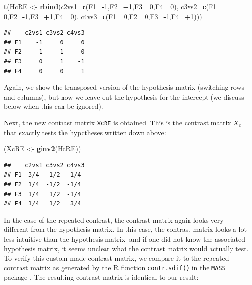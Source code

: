 \documentclass[12pt,]{krantz}
\newenvironment{Shaded}{\begin{snugshade}}{\end{snugshade}}
\newcommand{\KeywordTok}[1]{\textcolor[rgb]{0.13,0.29,0.53}{\textbf{#1}}}
\newcommand{\DataTypeTok}[1]{\textcolor[rgb]{0.13,0.29,0.53}{#1}}
\newcommand{\DecValTok}[1]{\textcolor[rgb]{0.00,0.00,0.81}{#1}}
\newcommand{\StringTok}[1]{\textcolor[rgb]{0.31,0.60,0.02}{#1}}
\newcommand{\OperatorTok}[1]{\textcolor[rgb]{0.81,0.36,0.00}{\textbf{#1}}}
\newcommand{\NormalTok}[1]{#1}
\theoremstyle{definition}
\theoremstyle{definition}
\theoremstyle{definition}
\theoremstyle{remark}
\begin{document}
\begin{Shaded}
\begin{Highlighting}[]
\KeywordTok{t}\NormalTok{(HcRE <-}\StringTok{ }\KeywordTok{rbind}\NormalTok{(}\DataTypeTok{c2vs1=}\KeywordTok{c}\NormalTok{(}\DataTypeTok{F1=}\OperatorTok{-}\DecValTok{1}\NormalTok{,}\DataTypeTok{F2=}\OperatorTok{+}\DecValTok{1}\NormalTok{,}\DataTypeTok{F3=} \DecValTok{0}\NormalTok{,}\DataTypeTok{F4=} \DecValTok{0}\NormalTok{),}
                \DataTypeTok{c3vs2=}\KeywordTok{c}\NormalTok{(}\DataTypeTok{F1=} \DecValTok{0}\NormalTok{,}\DataTypeTok{F2=}\OperatorTok{-}\DecValTok{1}\NormalTok{,}\DataTypeTok{F3=}\OperatorTok{+}\DecValTok{1}\NormalTok{,}\DataTypeTok{F4=} \DecValTok{0}\NormalTok{),}
                \DataTypeTok{c4vs3=}\KeywordTok{c}\NormalTok{(}\DataTypeTok{F1=} \DecValTok{0}\NormalTok{,}\DataTypeTok{F2=} \DecValTok{0}\NormalTok{,}\DataTypeTok{F3=}\OperatorTok{-}\DecValTok{1}\NormalTok{,}\DataTypeTok{F4=}\OperatorTok{+}\DecValTok{1}\NormalTok{)))}
\end{Highlighting}
\end{Shaded}

\begin{verbatim}
##    c2vs1 c3vs2 c4vs3
## F1    -1     0     0
## F2     1    -1     0
## F3     0     1    -1
## F4     0     0     1
\end{verbatim}

Again, we show the transposed version of the hypothesis matrix
(switching rows and columns), but now we leave out the hypothesis for
the intercept (we discuss below when this can be ignored).

Next, the new contrast matrix \texttt{XcRE} is obtained. This is the
contrast matrix \(X_c\) that exactly tests the hypotheses written down
above:

\begin{Shaded}
\begin{Highlighting}[]
\NormalTok{(XcRE <-}\StringTok{ }\KeywordTok{ginv2}\NormalTok{(HcRE))}
\end{Highlighting}
\end{Shaded}

\begin{verbatim}
##    c2vs1 c3vs2 c4vs3
## F1 -3/4  -1/2  -1/4 
## F2  1/4  -1/2  -1/4 
## F3  1/4   1/2  -1/4 
## F4  1/4   1/2   3/4
\end{verbatim}

In the case of the repeated contrast, the contrast matrix again looks
very different from the hypothesis matrix. In this case, the contrast
matrix looks a lot less intuitive than the hypothesis matrix, and if one
did not know the associated hypothesis matrix, it seems unclear what the
contrast matrix would actually test. To verify this custom-made contrast
matrix, we compare it to the repeated contrast matrix as generated by
the R function \texttt{contr.sdif()} in the \texttt{MASS} package
\citep{R-MASS}. The resulting contrast matrix is identical to our
result:
\end{document}
